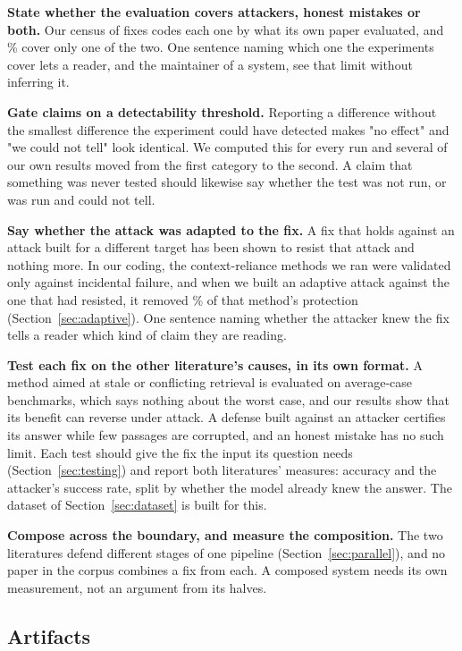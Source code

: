 \textbf{State whether the evaluation covers attackers, honest mistakes or both.} Our census of
fixes codes each one by what its own paper evaluated, and
\PctOneRegime{}\% cover only one of the two. One sentence naming which one the
experiments cover lets a reader, and the maintainer of a system, see that
limit without inferring it.

\textbf{Gate claims on a detectability threshold.} Reporting a difference
without the smallest difference the experiment could have detected makes "no
effect" and "we could not tell" look identical. We computed this for every run
and several of our own results moved from the first category to the second.
A claim that something was never tested should likewise say whether the
test was not run, or was run and could not tell.

\textbf{Say whether the attack was adapted to the fix.} A fix that
holds against an attack built for a different target has been shown to resist
that attack and nothing more. In our coding, the context-reliance methods we
ran were validated only against incidental failure, and when we built an
adaptive attack against the one that had resisted, it removed
\PctAcdRemovedGradient{}\% of that method's protection
(Section~\ref{sec:adaptive}). One sentence naming whether the attacker knew
the fix tells a reader which kind of claim they are reading.

\textbf{Test each fix on the other literature's causes, in its own
format.} A method aimed at stale or conflicting retrieval is evaluated on
average-case benchmarks, which says nothing about the worst case, and our
results show that its benefit can reverse under attack. A defense built
against an attacker certifies its answer while few passages are corrupted,
and an honest mistake has no such limit. Each test should give the fix the
input its question needs (Section~\ref{sec:testing}) and report both
literatures' measures: accuracy and the attacker's success rate, split by
whether the model already knew the answer. The dataset of
Section~\ref{sec:dataset} is built for this.

\textbf{Compose across the boundary, and measure the composition.} The two
literatures defend different stages of one pipeline
(Section~\ref{sec:parallel}), and no paper in the corpus combines a fix from
each. A composed system needs its own measurement, not an argument from its
halves.

\subsection{Artifacts}
\label{sec:artifacts}

